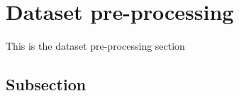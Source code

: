 \section{Dataset pre-processing}\label{Section label}
This is the dataset pre-processing section
\subsection{Subsection}\label{subsection}